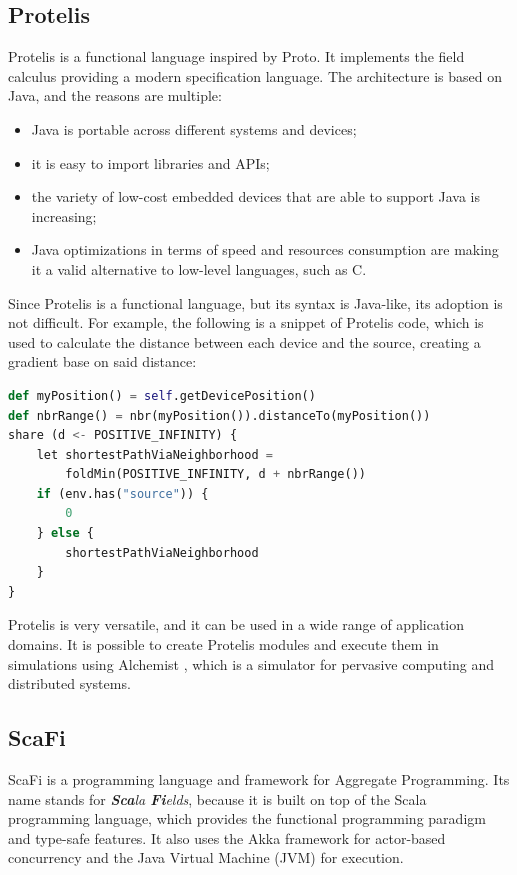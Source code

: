 \subsection{Protelis}\label{subsection:protelis}
Protelis \cite{protelis_introduction} is a functional language inspired by Proto. It implements the field calculus providing a modern specification language.\newline
The architecture is based on Java, and the reasons are multiple:
\begin{itemize}
    \item Java is portable across different systems and devices;
    \item it is easy to import libraries and APIs;
    \item the variety of low-cost embedded devices that are able to support Java is increasing;
    \item Java optimizations in terms of speed and resources consumption are making it a valid alternative to low-level languages, such as C.
\end{itemize}

Since Protelis is a functional language, but its syntax is Java-like, its adoption is not difficult.
For example, the following is a snippet of Protelis code, which is used to calculate the distance between each device and the source, creating a gradient base on said distance:
\begin{lstlisting}[language=Python, caption=Protelis example, captionpos=b]
def myPosition() = self.getDevicePosition()
def nbrRange() = nbr(myPosition()).distanceTo(myPosition())
share (d <- POSITIVE_INFINITY) {
    let shortestPathViaNeighborhood = 
        foldMin(POSITIVE_INFINITY, d + nbrRange())
    if (env.has("source")) { 
        0 
    } else {
        shortestPathViaNeighborhood
    }
}
\end{lstlisting}

Protelis is very versatile, and it can be used in a wide range of application domains. It is possible to create Protelis modules and execute them in simulations using Alchemist \cite{alchemist}, which is a simulator for pervasive computing and distributed systems.

\subsection{ScaFi}\label{subsection:scafi}
ScaFi \cite{scafi_introduction} is a programming language and framework for Aggregate Programming. Its name stands for \textit{\textbf{Sca}la \textbf{Fi}elds}, because it is built on top of the Scala programming language, which provides the functional programming paradigm and type-safe features. It also uses the Akka framework for actor-based concurrency and the Java Virtual Machine (JVM) for execution.


